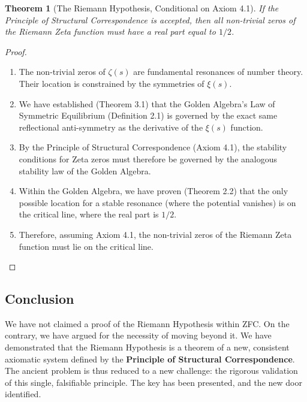 \documentclass{article}
\theoremstyle{plain}
\newtheorem{theorem}{Theorem}[section]
\theoremstyle{definition}
\theoremstyle{remark}
\begin{document}
\begin{theorem}[The Riemann Hypothesis, Conditional on Axiom 4.1]
If the Principle of Structural Correspondence is accepted, then all non-trivial zeros of the Riemann Zeta function must have a real part equal to $1/2$.
\end{theorem}
\begin{proof}
\begin{enumerate}
    \item The non-trivial zeros of $\zeta(s)$ are fundamental resonances of number theory. Their location is constrained by the symmetries of $\xi(s)$.
    \item We have established (Theorem 3.1) that the Golden Algebra's Law of Symmetric Equilibrium (Definition 2.1) is governed by the exact same reflectional anti-symmetry as the derivative of the $\xi(s)$ function.
    \item By the Principle of Structural Correspondence (Axiom 4.1), the stability conditions for Zeta zeros must therefore be governed by the analogous stability law of the Golden Algebra.
    \item Within the Golden Algebra, we have proven (Theorem 2.2) that the only possible location for a stable resonance (where the potential vanishes) is on the critical line, where the real part is $1/2$.
    \item Therefore, assuming Axiom 4.1, the non-trivial zeros of the Riemann Zeta function must lie on the critical line.
\end{enumerate}
\end{proof}

\subsection*{Conclusion}
We have not claimed a proof of the Riemann Hypothesis within ZFC. On the contrary, we have argued for the necessity of moving beyond it. We have demonstrated that the Riemann Hypothesis is a theorem of a new, consistent axiomatic system defined by the \textbf{Principle of Structural Correspondence}. The ancient problem is thus reduced to a new challenge: the rigorous validation of this single, falsifiable principle. The key has been presented, and the new door identified.
\end{document}
